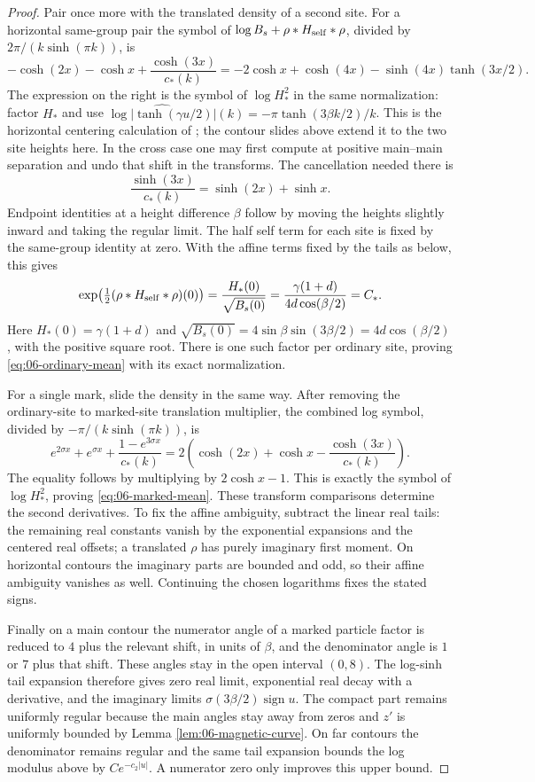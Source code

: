 \begin{proof}
Pair once more with the translated density of a second site.
For a horizontal same-group pair the symbol of
\(\log B_s+\rho*H_{\rm self}*\rho\), divided by
\(2\pi/(k\sinh(\pi k))\), is
\[
 -\cosh(2x)-\cosh x+\frac{\cosh(3x)}{c_*(k)}
 =-2\cosh x+\cosh(4x)-\sinh(4x)\tanh(3x/2).
\]
The expression on the right is the symbol of \(\log H_*^2\) in the
same normalization: factor \(H_*\) and use
\(\widehat{\log|\tanh(\gamma u/2)|}(k)
=-\pi\tanh(3\beta k/2)/k\).
This is the horizontal centering calculation of
\cite[Lemma~3.1]{Electric}; the contour slides above extend it to
the two site heights here.  In the cross case one may first compute
at positive main--main separation and undo that shift in the
transforms.  The cancellation needed there is
\[
 \frac{\sinh(3x)}{c_*(k)}=\sinh(2x)+\sinh x.
\]
Endpoint identities at a height difference \(\beta\) follow by
moving the heights slightly inward and taking the regular limit.
The half self term for each site is fixed by the same-group identity
at zero.  With the affine terms fixed by the tails as below, this gives
\[
 \exp\!\left(\tfrac12(\rho*H_{\rm self}*\rho)(0)\right)
 =\frac{H_*(0)}{\sqrt{B_s(0)}}
 =\frac{\gamma(1+d)}{4d\cos(\beta/2)}=C_*.
\]
Here \(H_*(0)=\gamma(1+d)\) and
\(\sqrt{B_s(0)}=4\sin\beta\sin(3\beta/2)=4d\cos(\beta/2)\),
with the positive square root.  There is one such factor per ordinary
site, proving \eqref{eq:06-ordinary-mean} with its exact normalization.

For a single mark, slide the density in the same way.
After removing the ordinary-site to marked-site translation
multiplier, the combined log symbol, divided by
\(-\pi/(k\sinh(\pi k))\), is
\[
 e^{2\sigma x}+e^{\sigma x}
 +\frac{1-e^{3\sigma x}}{c_*(k)}
 =
 2\left(\cosh(2x)+\cosh x-\frac{\cosh(3x)}{c_*(k)}\right).
\]
The equality follows by multiplying by \(2\cosh x-1\).
This is exactly the symbol of \(\log H_*^2\), proving
\eqref{eq:06-marked-mean}.
These transform comparisons determine the second derivatives.
To fix the affine ambiguity, subtract the linear real tails:
the remaining real constants vanish by the exponential expansions
and the centered real offsets; a translated \(\rho\) has purely
imaginary first moment.  On horizontal contours the imaginary
parts are bounded and odd, so their affine ambiguity vanishes as
well.  Continuing the chosen logarithms fixes the stated signs.

Finally on a main contour the numerator angle of a marked particle
factor is reduced to \(4\) plus the relevant shift, in units of
\(\beta\), and the denominator angle is \(1\) or \(7\) plus that
shift.  These angles stay in the open interval \((0,8)\).
The log-sinh tail expansion therefore gives zero real limit,
exponential real decay with a derivative, and the imaginary
limits \(\sigma(3\beta/2)\operatorname{sign}u\).
The compact part remains uniformly regular because the main
angles stay away from zeros and \(z'\) is uniformly bounded by
Lemma \ref{lem:06-magnetic-curve}.
On far contours the denominator remains regular and the same
tail expansion bounds the log modulus above by \(Ce^{-c_2|u|}\).
A numerator zero only improves this upper bound.
\end{proof}

